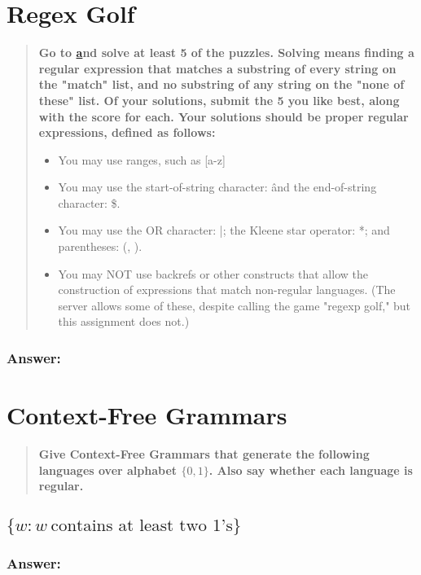 \documentclass[titlepage]{article}\usepackage[]{graphicx}\usepackage[]{color}
\begin{document}
\section{Regex Golf}
\begin{quote}
  \textbf{Go to \href{https://regex.alf.nu/} and solve at least 5 of the
  puzzles.  Solving means finding a regular expression that matches a substring
of every string on the "match" list, and no substring of any string on the
"none of these" list. Of your solutions, submit the 5 you like best, along
with the score for each.  Your solutions should be proper regular expressions,
defined as follows:}
\begin{itemize}
  \item You may use ranges, such as [a-z]
  \item You may use the start-of-string character: \^
    and the end-of-string character: \$.
  \item You may use the OR character: |; 
    the Kleene star operator: *; and parentheses: (, ).
  \item You may NOT use backrefs or other constructs that allow the construction of
        expressions that match non-regular languages.  (The server allows some of
        these, despite calling the game "regexp golf," but this assignment does not.)
\end{itemize}
\end{quote}
\subsubsection*{Answer:}
\vspace{5cm}


\section{Context-Free Grammars}
\begin{quote}
  \textbf{Give Context-Free Grammars that generate the following languages over
    alphabet \(\{0,1\}\). Also say whether each language is regular.}
\end{quote}
\subsection{\(\{w : w \ \mbox{contains at least two 1's}\}\)}
\subsubsection*{Answer:}
\vspace{5cm}
\end{document}
